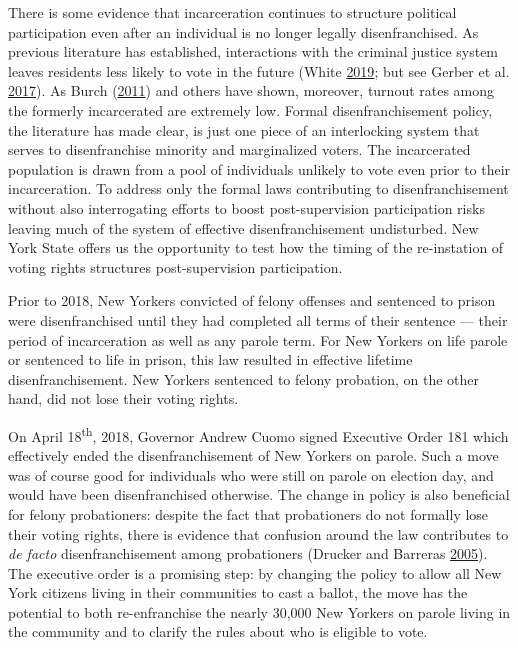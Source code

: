 \documentclass[
  12pt,
]{article}
\begin{document}
There is some evidence that incarceration continues to structure political participation even after an individual is no longer legally disenfranchised. As previous literature has established, interactions with the criminal justice system leaves residents less likely to vote in the future (White \protect\hyperlink{ref-White2019}{2019}; but see Gerber et al. \protect\hyperlink{ref-Gerber2017}{2017}). As Burch (\protect\hyperlink{ref-Burch2011}{2011}) and others have shown, moreover, turnout rates among the formerly incarcerated are extremely low. Formal disenfranchisement policy, the literature has made clear, is just one piece of an interlocking system that serves to disenfranchise minority and marginalized voters. The incarcerated population is drawn from a pool of individuals unlikely to vote even prior to their incarceration. To address only the formal laws contributing to disenfranchisement without also interrogating efforts to boost post-supervision participation risks leaving much of the system of effective disenfranchisement undisturbed. New York State offers us the opportunity to test how the timing of the re-instation of voting rights structures post-supervision participation.

Prior to 2018, New Yorkers convicted of felony offenses and sentenced to prison were disenfranchised until they had completed all terms of their sentence --- their period of incarceration as well as any parole term. For New Yorkers on life parole or sentenced to life in prison, this law resulted in effective lifetime disenfranchisement. New Yorkers sentenced to felony probation, on the other hand, did not lose their voting rights.

On April 18\textsuperscript{th}, 2018, Governor Andrew Cuomo signed Executive Order 181 which effectively ended the disenfranchisement of New Yorkers on parole. Such a move was of course good for individuals who were still on parole on election day, and would have been disenfranchised otherwise. The change in policy is also beneficial for felony probationers: despite the fact that probationers do not formally lose their voting rights, there is evidence that confusion around the law contributes to \emph{de facto} disenfranchisement among probationers (Drucker and Barreras \protect\hyperlink{ref-Drucker2005}{2005}). The executive order is a promising step: by changing the policy to allow all New York citizens living in their communities to cast a ballot, the move has the potential to both re-enfranchise the nearly 30,000 New Yorkers on parole living in the community and to clarify the rules about who is eligible to vote.
\end{document}
